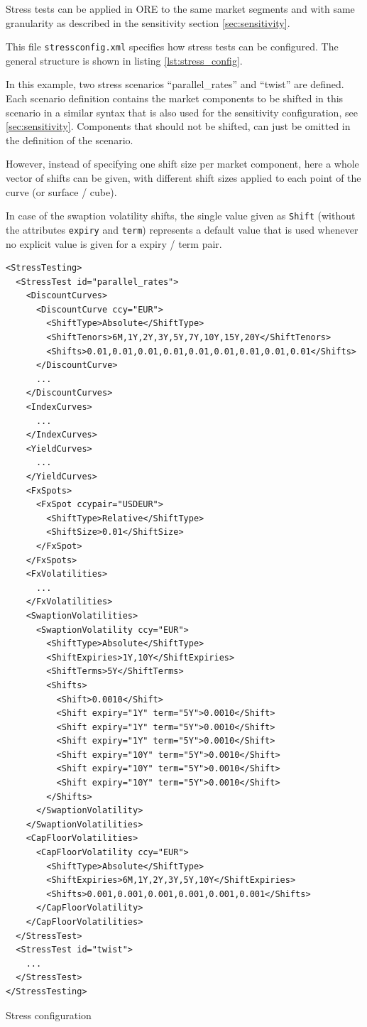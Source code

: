 \documentclass[12pt, a4paper]{article}
\newenvironment{longlisting}{\captionsetup{type=listing}}{}
\begin{document}
Stress tests can be applied in ORE to the same market segments and with same granularity as described in the sensitivity section \ref{sec:sensitivity}.

\medskip
This file {\tt stressconfig.xml} specifies how stress tests can be configured. The general structure is shown in listing
\ref{lst:stress_config}.

In this example, two stress scenarios ``parallel\_rates'' and ``twist'' are defined. Each scenario definition contains
the market components to be shifted in this scenario in a similar syntax that is also used for the sensitivity
configuration, see \ref{sec:sensitivity}. Components that should not be shifted, can just be omitted in the definition
of the scenario.

However, instead of specifying one shift size per market component, here a whole vector of shifts can be given, with
different shift sizes applied to each point of the curve (or surface / cube).

In case of the swaption volatility shifts, the single value given as {\tt Shift} (without the attributes {\tt expiry}
and {\tt term}) represents a default value that is used whenever no explicit value is given for a expiry / term pair.

\begin{longlisting}
  \begin{verbatim}
<StressTesting>
  <StressTest id="parallel_rates">
    <DiscountCurves>
      <DiscountCurve ccy="EUR">
        <ShiftType>Absolute</ShiftType>
        <ShiftTenors>6M,1Y,2Y,3Y,5Y,7Y,10Y,15Y,20Y</ShiftTenors>
        <Shifts>0.01,0.01,0.01,0.01,0.01,0.01,0.01,0.01,0.01</Shifts>
      </DiscountCurve>
      ...
    </DiscountCurves>
    <IndexCurves>
      ...
    </IndexCurves>
    <YieldCurves>
      ...
    </YieldCurves>
    <FxSpots>
      <FxSpot ccypair="USDEUR">
        <ShiftType>Relative</ShiftType>
        <ShiftSize>0.01</ShiftSize>
      </FxSpot>
    </FxSpots>
    <FxVolatilities>
      ...
    </FxVolatilities>
    <SwaptionVolatilities>
      <SwaptionVolatility ccy="EUR">
        <ShiftType>Absolute</ShiftType>
        <ShiftExpiries>1Y,10Y</ShiftExpiries>
        <ShiftTerms>5Y</ShiftTerms>
        <Shifts>
          <Shift>0.0010</Shift>
          <Shift expiry="1Y" term="5Y">0.0010</Shift>
          <Shift expiry="1Y" term="5Y">0.0010</Shift>
          <Shift expiry="1Y" term="5Y">0.0010</Shift>
          <Shift expiry="10Y" term="5Y">0.0010</Shift>
          <Shift expiry="10Y" term="5Y">0.0010</Shift>
          <Shift expiry="10Y" term="5Y">0.0010</Shift>
        </Shifts>
      </SwaptionVolatility>
    </SwaptionVolatilities>
    <CapFloorVolatilities>
      <CapFloorVolatility ccy="EUR">
        <ShiftType>Absolute</ShiftType>
        <ShiftExpiries>6M,1Y,2Y,3Y,5Y,10Y</ShiftExpiries>
        <Shifts>0.001,0.001,0.001,0.001,0.001,0.001</Shifts>
      </CapFloorVolatility>
    </CapFloorVolatilities>
  </StressTest>
  <StressTest id="twist">
    ...
  </StressTest>
</StressTesting>
  \end{verbatim}
\caption{Stress configuration}
\label{lst:stress_config}
\end{longlisting}
\end{document}
